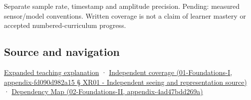 Separate sample rate, timestamp and amplitude precision. Pending: measured sensor/model conventions. Written coverage is not a claim of learner mastery or accepted numbered-curriculum progress.

\subsection{Source and navigation}\label{source-and-navigation}

\href{Continuous\%20Notes/University\%20-\%20Worlds,\%20Images\%20and\%20Inference\%20-\%20Graphics,\%20Vision\%20and\%20Photography\#Sampling\%20is\%20a\%20question\%20of\%20what\%20remains\%20distinguishable}{Expanded teaching explanation} · \href{}{Independent coverage (01-Foundations-I, appendix-fd090d982a15 § XR01 - Independent seeing and representation source)} · \href{}{Dependency Map (02-Foundations-II, appendix-4ad47bdd269a)}
